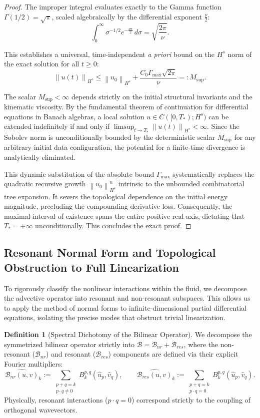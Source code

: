 \documentclass[12pt,a4paper]{article}
\theoremstyle{plain}
\theoremstyle{definition}
\newtheorem{definition}[theorem]{Definition}
\theoremstyle{remark}
\newcommand{\Hs}{H^s}
\newcommand{\norm}[1]{\left\|#1\right\|}
\newcommand{\BB}{\mathcal{B}}
\newcommand{\Bnr}{\mathcal{B}_{nr}}
\newcommand{\Bres}{\mathcal{B}_{res}}
\begin{document}
\begin{proof}
The improper integral evaluates exactly to the Gamma function $\Gamma(1/2) = \sqrt{\pi}$, scaled algebraically by the differential exponent $\frac{\nu}{2}$:
\[
  \int_0^\infty \sigma^{-1/2} e^{-\frac{\nu\sigma}{2}} \,d\sigma = \sqrt{\frac{2\pi}{\nu}}.
\]

This establishes a universal, time-independent \emph{a priori} bound on the $H^s$ norm of the exact solution for all $t \ge 0$:
\[
  \norm{u(t)}_{H^s} \le \norm{u_0}_{H^s} + \frac{C_0 \Gamma_{\max} \sqrt{2\pi}}{\nu} =: M_{\sup}.
\]

The scalar $M_{\sup} < \infty$ depends strictly on the initial structural invariants and the kinematic viscosity. By the fundamental theorem of continuation for differential equations in Banach algebras, a local solution $u \in C([0,T_*); \Hs)$ can be extended indefinitely if and only if $\limsup_{t \to T_*} \norm{u(t)}_{H^s} < \infty$. Since the Sobolev norm is unconditionally bounded by the deterministic scalar $M_{\sup}$ for any arbitrary initial data configuration, the potential for a finite-time divergence is analytically eliminated. 

This dynamic substitution of the absolute bound $\Gamma_{\max}$ systematically replaces the quadratic recursive growth $\norm{u_0}_{H^s}^n$ intrinsic to the unbounded combinatorial tree expansion. It severs the topological dependence on the initial energy magnitude, precluding the compounding derivative loss. Consequently, the maximal interval of existence spans the entire positive real axis, dictating that $T_* = +\infty$ unconditionally. This concludes the exact proof.
\end{proof}


\subsection{Resonant Normal Form and Topological Obstruction to Full Linearization}
\label{subsec:normal_form}

To rigorously classify the nonlinear interactions within the fluid, we decompose the advective operator into resonant and non-resonant subspaces. This allows us to apply the method of normal forms to infinite-dimensional partial differential equations, isolating the precise modes that obstruct trivial linearization.

\begin{definition}[Spectral Dichotomy of the Bilinear Operator]
\label{def:decomp}
We decompose the symmetrized bilinear operator strictly into $\BB = \Bnr + \Bres$, where the non-resonant ($\Bnr$) and resonant ($\Bres$) components are defined via their explicit Fourier multipliers:
\[
  \widehat{\Bnr(u,v)}_k := \sum_{\substack{p+q=k\\p\cdot q\neq 0}} B_k^{p,q}(\hat{u}_p,\hat{v}_q), \qquad \widehat{\Bres(u,v)}_k := \sum_{\substack{p+q=k\\p\cdot q=0}} B_k^{p,q}(\hat{u}_p,\hat{v}_q).
\]
Physically, resonant interactions ($p \cdot q = 0$) correspond strictly to the coupling of orthogonal wavevectors.
\end{definition}
\end{document}

